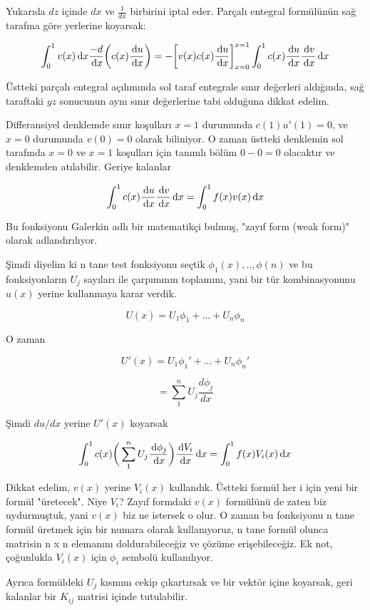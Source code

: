 \documentclass[12pt,fleqn]{article}\usepackage{../../common}
\begin{document}
Yukarıda $dz$ içinde $dx$ ve $\frac{1}{dx}$ birbirini iptal eder. Parçalı
entegral formülünün sağ tarafına göre yerlerine koyarsak:

$$
\int_0^1 v(x)\,\mathrm{d} x \frac{-d}{\,\mathrm{d} x} \bigg( c(x) \frac{\,\mathrm{d} u}{\,\mathrm{d} x} \bigg)
= - \bigg[ v(x) c(x) \frac{\,\mathrm{d} u}{\,\mathrm{d} x} \bigg]_{x=0}^{x=1} \int_0^1 c(x) \frac{\,\mathrm{d} u}{\,\mathrm{d} x} \frac{\,\mathrm{d} v}{\,\mathrm{d} x} \,\mathrm{d} x
$$

Üstteki parçalı entegral açılımında sol taraf entegrale sınır
değerleri aldığında, sağ taraftaki $yz$ sonucunun aynı sınır
değerlerine tabi olduğuna dikkat edelim.

Differansiyel denklemde sınır koşulları $x=1$ durumunda $c(1)u'(1)=0$,
ve $x=0$ durumunda $v(0)=0$ olarak biliniyor. O zaman üstteki
denklemin sol tarafında $x=0$ ve $x=1$ koşulları için tanımlı bölüm $0
- 0 = 0$ olacaktır ve denklemden atılabilir. Geriye kalanlar

$$
\int_0^1 c(x) \frac{\,\mathrm{d} u}{\,\mathrm{d} x} \frac{\,\mathrm{d} v}{\,\mathrm{d} x} \,\mathrm{d} x
= \int_0^1 f(x)v(x) \,\mathrm{d} x
$$

Bu fonksiyonu Galerkin adlı bir matematikçi bulmuş, "zayıf form (weak
form)" olarak adlandırılıyor.

Şimdi diyelim ki n tane test fonksiyonu seçtik $\phi_1(x),..,\phi(n)$
ve bu fonksiyonların $U_j$ sayıları ile çarpımının toplamını, yani bir
tür kombinasyonunu $u(x)$ yerine kullanmaya karar verdik.

$$ U(x) = U_1 \phi_1+ ... + U_n\phi_n $$

O zaman

$$ U'(x) = U_1 \phi_1'+ ... + U_n\phi_n' $$

$$ = \sum_1^n U_j \frac{d\phi_j}{dx} $$

Şimdi $du / dx$ yerine $U'(x)$ koyarsak

$$
\int_0^1 c(x) \bigg( \sum_1^n U_j \frac{\,\mathrm{d}\phi_j}{\,\mathrm{d} x}\bigg)
\frac{\,\mathrm{d} V_i}{\,\mathrm{d} x}\,\mathrm{d} x
= \int_0^1 f(x)V_i(x)\,\mathrm{d} x
$$

Dikkat edelim, $v(x)$ yerine $V_i(x)$ kullandık. Üstteki formül her i için yeni
bir formül "üretecek". Niye $V_i$? Zayıf formdaki $v(x)$ formülünü de zaten biz
uydurmuştuk, yani $v(x)$ biz ne istersek o olur. O zaman bu fonksiyonu n tane
formül üretmek için bir numara olarak kullanıyoruz, n tane formül olunca
matrisin n x n elemanını doldurabileceğiz ve çözüme erişebileceğiz. Ek not,
çoğunlukla $V_i(x)$ için $\phi_i$ sembolü kullanılıyor.

Ayrıca formüldeki $U_j$ kısmını cekip çıkartırsak ve bir vektör içine koyarsak,
geri kalanlar bir $K_{ij}$ matrisi içinde tutulabilir. 
\end{document}
